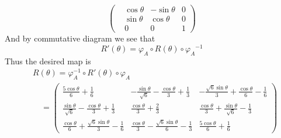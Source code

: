 \documentclass[12pt]{article}
\def\ff#1#2{\frac{#1}{#2}}
\newcommand{\eq}[1]{\begin{align*}#1\end{align*}}
\def\ct{\cos{\theta}}
\def\st{\sin{\theta}}
\def\sq#1{\sqrt#1}
\begin{document}
{\[\begin{pmatrix}
				&\cos\theta&-\sin\theta&0\\
				&\sin\theta&\cos\theta&0\\
				&0&0&1
					\end{pmatrix}
	\]
	And by commutative diagram we see that
	\[
	R'(\theta)=\varphi_A\circ R(\theta)\circ{\varphi_A}^{-1}
	\]
	Thus the desired map is
	\eq{
	&R(\theta)=\varphi_A^{-1}\circ R' (\theta)\circ{\varphi_A}\\
	&\quad=\begin{pmatrix}
	\ff{5\ct}{6}+\ff{1}{6}&-\ff{\st}{\sq6}-\ff{\ct}{3}+\ff{1}{3}&-\ff{\sq6\st}{3}+\ff{\ct}{6}-\ff{1}{6}\\
	\ff{\st}{\sq6}-\ff{\ct}{3}+\ff{1}{3}&\ff{\ct}{3}+\ff{2}{3}&\ff{\ct}{3}+\ff{\st}{\sq6}-\ff{1}{3}\\
	\ff{\ct}{6}+\ff{\sq6\st}{3}-\ff{1}{6}&\ff{\ct}{3}-\ff{\sq6\st}{6}-\ff{1}{3}&\ff{5\ct}{6}+\ff{1}{6}
	\end{pmatrix}
	}
}
\end{document}
